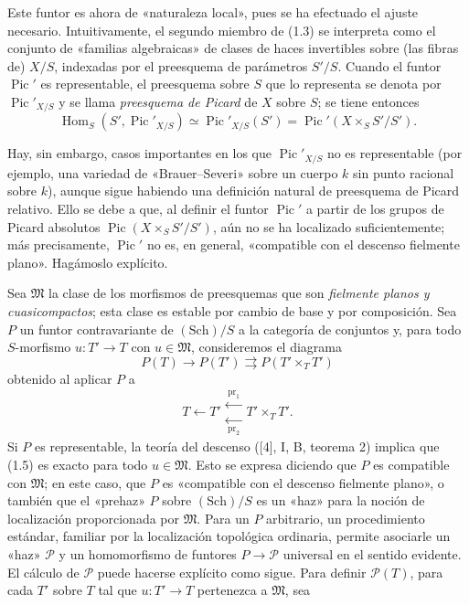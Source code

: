 \documentclass[11pt,twoside,openany]{book}
\numberwithin{equation}{section}
\newcommand{\src}[1]{%
  \phantomsection\hypertarget{src:#1}{}%
  \marginpar{\raggedleft\footnotesize\sffamily #1}%
}
\theoremstyle{plain}
\theoremstyle{definition}
\theoremstyle{remark}
\newcommand{\FgaUnitKey}{frontmatter}
\renewcommand{\src}[1]{%
  \phantomsection\hypertarget{src:\FgaUnitKey:#1}{}%
  \marginpar{\raggedleft\footnotesize\sffamily #1}%
}
\theoremstyle{plain}
\theoremstyle{definition}
\theoremstyle{remark}
\begin{document}
\src{144}
Este funtor es ahora de «naturaleza local», pues se ha efectuado el ajuste
necesario. Intuitivamente, el segundo miembro de (1.3) se interpreta como el
conjunto de «familias algebraicas» de clases de haces invertibles sobre (las
fibras de) $X/S$, indexadas por el preesquema de parámetros $S'/S$. Cuando el
funtor $\operatorname{Pic}'$ es representable, el preesquema sobre $S$ que lo
representa se denota por $\operatorname{Pic}'_{X/S}$ y se llama
\emph{preesquema de Picard} de $X$ sobre $S$; se tiene entonces
\begin{equation}
\operatorname{Hom}_S(S',\operatorname{Pic}'_{X/S})
\simeq\operatorname{Pic}'_{X/S}(S')
=\operatorname{Pic}'(X\times_SS'/S').
\tag{1.4}
\end{equation}

Hay, sin embargo, casos importantes en los que $\operatorname{Pic}'_{X/S}$ no
es representable (por ejemplo, una variedad de «Brauer--Severi» sobre un
cuerpo $k$ sin punto racional sobre $k$), aunque sigue habiendo una definición
natural de preesquema de Picard relativo. Ello se debe a que, al definir el
funtor $\operatorname{Pic}'$ a partir de los grupos de Picard absolutos
$\operatorname{Pic}(X\times_SS'/S')$, aún no se ha localizado suficientemente;
más precisamente, $\operatorname{Pic}'$ no es, en general, «compatible con el
descenso fielmente plano». Hagámoslo explícito.

Sea $\mathfrak M$ la clase de los morfismos de preesquemas que son
\emph{fielmente planos y cuasicompactos}; esta clase es estable por cambio de
base y por composición. Sea $P$ un funtor contravariante de $(\mathrm{Sch})/S$
a la categoría de conjuntos y, para todo $S$-morfismo
$u:T'\longrightarrow T$ con $u\in\mathfrak M$, consideremos el diagrama
\begin{equation}
P(T)\longrightarrow P(T')\rightrightarrows P(T'\times_TT')
\tag{1.5}
\end{equation}
obtenido al aplicar $P$ a
\[
T\longleftarrow T'\mathrel{\substack{\xleftarrow{\,\mathrm{pr}_1\,}\\[-0.35ex]
\xleftarrow[\,\mathrm{pr}_2\,]{}}}T'\times_TT'.
\]
Si $P$ es representable, la teoría del descenso ([4], I, B, teorema 2) implica
que (1.5) es exacto para todo $u\in\mathfrak M$. Esto se expresa diciendo que
$P$ es compatible con $\mathfrak M$; en este caso, que $P$ es «compatible con
el descenso fielmente plano», o también que el «prehaz» $P$ sobre
$(\mathrm{Sch})/S$ es un «haz» para la noción de localización proporcionada
por $\mathfrak M$. Para un $P$ arbitrario, un procedimiento estándar, familiar
por la localización topológica ordinaria, permite asociarle un «haz»
$\mathcal P$ y un homomorfismo de funtores $P\longrightarrow\mathcal P$
universal en el sentido evidente. El cálculo de $\mathcal P$ puede hacerse
explícito como sigue. Para definir $\mathcal P(T)$, para cada $T'$ sobre $T$
tal que $u:T'\longrightarrow T$ pertenezca a $\mathfrak M$, sea
\end{document}
